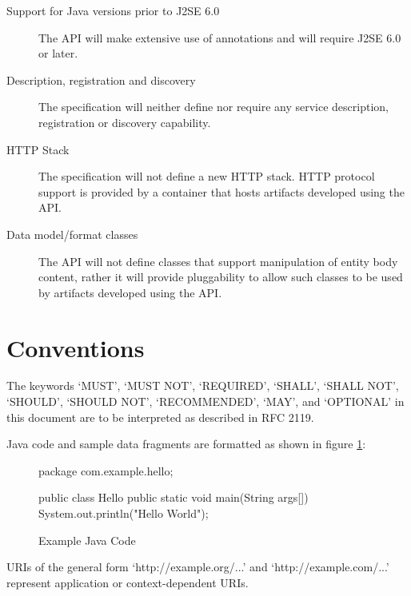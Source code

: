 \begin{description}

\item[Support for Java versions prior to J2SE 6.0] The API will make extensive use of annotations and will require J2SE 6.0 or later.

\item[Description, registration and discovery] The specification will neither define nor require any service description, registration or discovery capability.


\item[HTTP Stack] The specification will not define a new HTTP stack. HTTP protocol support is provided by a container that hosts artifacts developed using the API.

\item[Data model/format classes] The API will not define classes that support manipulation of entity body content, rather it will provide pluggability to allow such classes to be used by artifacts developed using the API.

\end{description}

\section{Conventions}

The keywords `MUST', `MUST NOT', `REQUIRED', `SHALL', `SHALL NOT', `SHOULD', `SHOULD NOT', `RECOMMENDED', `MAY', and `OPTIONAL' in this document are to be interpreted as described in RFC 2119\cite{rfc2119}. 

Java code and sample data fragments are formatted as shown in figure \ref{ex1}:

\begin{figure}[hbtp]
\caption{Example Java Code}
\label{ex1}
\begin{listing}{1}
package com.example.hello;

public class Hello {
    public static void main(String args[]) {
        System.out.println("Hello World");
    }
}\end{listing}
\end{figure}

URIs of the general form `http://example.org/...' and `http://example.com/...' represent application or context-dependent URIs.

